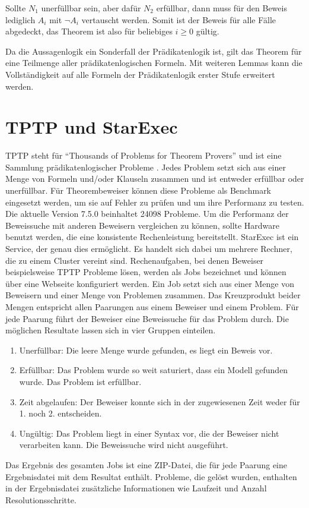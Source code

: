 Sollte $N_1$ unerfüllbar sein, aber dafür $N_2$ erfüllbar, dann muss für den Beweis lediglich $A_i$ mit $\neg A_i$ vertauscht werden. Somit ist der Beweis für alle Fälle abgedeckt, das Theorem ist also für beliebiges $i \geq 0$ gültig.

Da die Aussagenlogik ein Sonderfall der Prädikatenlogik ist, gilt das Theorem für eine Teilmenge aller prädikatenlogischen Formeln. Mit weiteren Lemmas kann die Vollständigkeit auf alle Formeln der Prädikatenlogik erster Stufe erweitert werden. \cite{Wos1965Sos}
		
	\section{TPTP und StarExec}
	
TPTP steht für "`Thousands of Problems for Theorem Provers"' und ist eine Sammlung prädikatenlogischer Probleme \cite{Sutcliff2021TPTP}. Jedes Problem setzt sich aus einer Menge von Formeln und/oder Klauseln zusammen und ist entweder erfüllbar oder unerfüllbar. Für Theorembeweiser können diese Probleme als Benchmark eingesetzt werden, um sie auf Fehler zu prüfen und um ihre Performanz zu testen. Die aktuelle Version 7.5.0 beinhaltet 24098 Probleme.
Um die Performanz der Beweissuche mit anderen Beweisern vergleichen zu können, sollte Hardware benutzt werden, die eine konsistente Rechenleistung bereitstellt. StarExec ist ein Service, der genau dies ermöglicht. Es handelt sich dabei um mehrere Rechner, die zu einem Cluster vereint sind. \cite{Sutcliff2022StarExec}
 Rechenaufgaben, bei denen Beweiser beispielsweise TPTP Probleme lösen, werden als Jobs bezeichnet und können über eine Webseite konfiguriert werden. Ein Job setzt sich aus einer Menge von Beweisern und einer Menge von Problemen zusammen. Das Kreuzprodukt beider Mengen entspricht allen Paarungen aus einem Beweiser und einem Problem. Für jede Paarung führt der Beweiser eine Beweissuche für das Problem durch. Die möglichen Resultate lassen sich in vier Gruppen einteilen. 
\begin{enumerate}
	\item Unerfüllbar: Die leere Menge wurde gefunden, es liegt ein Beweis vor.
	\item Erfüllbar: Das Problem wurde so weit saturiert, dass ein Modell gefunden wurde. Das Problem ist erfüllbar.
	\item Zeit abgelaufen: Der Beweiser konnte sich in der zugewiesenen Zeit weder für 1. noch 2. entscheiden.
	\item Ungültig: Das Problem liegt in einer Syntax vor, die der Beweiser nicht verarbeiten kann. Die Beweissuche wird nicht ausgeführt.
\end{enumerate}
Das Ergebnis des gesamten Jobs ist eine ZIP-Datei, die für jede Paarung eine Ergebnisdatei mit dem Resultat enthält. Probleme, die gelöst wurden, enthalten in der Ergebnisdatei zusätzliche Informationen wie Laufzeit und Anzahl Resolutionsschritte.


